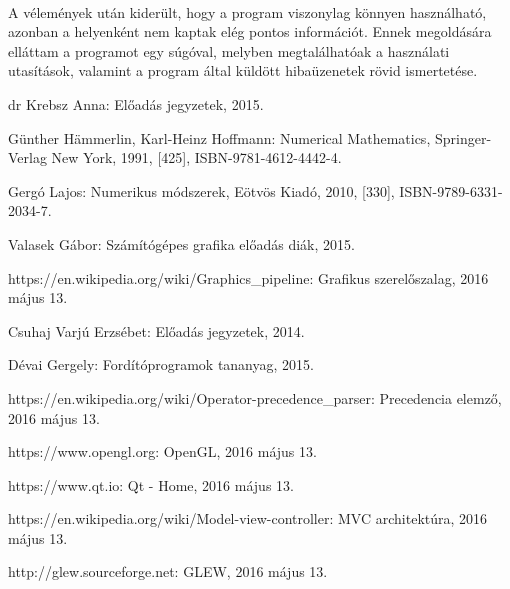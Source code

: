 \documentclass[12pt]{report}
\begin{document}
\paragraph{}
A vélemények után kiderült, hogy a program viszonylag könnyen használható, azonban a helyenként nem kaptak elég pontos információt. Ennek megoldására elláttam a programot egy súgóval, melyben megtalálhatóak a használati utasítások, valamint a program által küldött hibaüzenetek rövid ismertetése.

\begin{thebibliography}{20}
  
  dr Krebsz Anna: Előadás jegyzetek, 2015.

  Günther Hämmerlin, Karl-Heinz Hoffmann: Numerical Mathematics, Springer-Verlag New York, 1991, [425], ISBN-9781-4612-4442-4.
  
  Gergó Lajos: Numerikus módszerek, Eötvös Kiadó, 2010, [330], ISBN-9789-6331-2034-7.

  Valasek Gábor: Számítógépes grafika előadás diák, 2015.
  
  https://en.wikipedia.org/wiki/Graphics\_pipeline: Grafikus szerelőszalag, 2016 május 13.
    
  Csuhaj Varjú Erzsébet: Előadás jegyzetek, 2014.
  
  Dévai Gergely: Fordítóprogramok tananyag, 2015.
    
  https://en.wikipedia.org/wiki/Operator-precedence\_parser: Precedencia elemző, 2016 május 13.
    
  https://www.opengl.org: OpenGL, 2016 május 13.

  https://www.qt.io: Qt - Home, 2016 május 13.
    
  https://en.wikipedia.org/wiki/Model-view-controller: MVC architektúra, 2016 május 13.
  
  http://glew.sourceforge.net: GLEW, 2016 május 13.

\end{thebibliography}
\end{document}
